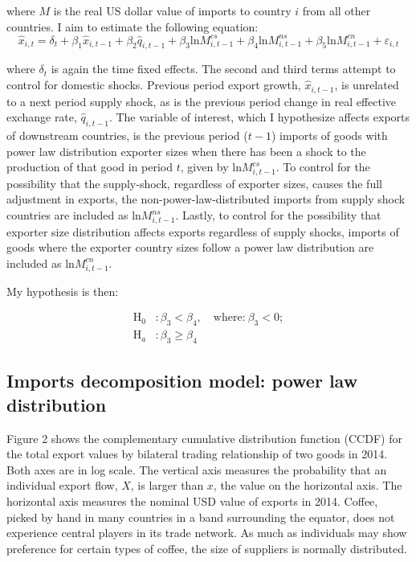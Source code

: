 \documentclass[10pt,letterpaper]{article}
\begin{document}
where $M$ is the real US dollar value of imports to country $i$ from all other countries. I aim to estimate the following equation:
$$ \hat{x}_{i,t} = \delta_{t} + \beta_1 \hat{x}_{i,t-1} + \beta_2 \hat{q}_{i,t-1} + \beta_3 \text{ln} M^{cs}_{i,t-1} + \beta_4 \text{ln} M^{ns}_{i,t-1} + \beta_5 \text{ln} M^{cn}_{i,t-1} + \varepsilon_{i,t} $$

where $\delta_t$ is again the time fixed effects. The second and third terms attempt to control for domestic shocks. Previous period export growth, $\hat{x}_{i,t-1}$,  is unrelated to a next period supply shock, as is the previous period change in real effective exchange rate, $\hat{q}_{i,t-1}$. The variable of interest, which I hypothesize affects exports of downstream countries, is the previous period ($t-1$) imports of goods with power law distribution exporter sizes when there has been a shock to the production of that good in period $t$, given by $\text{ln} M^{cs}_{i,t-1}$. To control for the possibility that the supply-shock, regardless of exporter sizes, causes the full adjustment in exports, the non-power-law-distributed imports from supply shock countries are included as $\text{ln} M^{ns}_{i,t-1}$. Lastly, to control for the possibility that exporter size distribution affects exports regardless of supply shocks, imports of goods where the exporter country sizes follow a power law distribution are included as $\text{ln} M^{cn}_{i,t-1}$.

My hypothesis is then:

\begin{align*}
\text{H}_0 &: \beta_3 < \beta_4, \quad \text{where:} \ \beta_3 < 0; \\
\text{H}_a &: \beta_3 \geq \beta_4 
\end{align*}

\subsection{Imports decomposition model: power law distribution}

Figure 2 shows the complementary cumulative distribution function (CCDF) for the total export values by bilateral trading relationship of two goods in 2014. Both axes are in log scale. The vertical axis measures the probability that an individual export flow, $X$, is larger than $x$, the value on the horizontal axis. The horizontal axis measures the nominal USD value of exports in 2014. Coffee, picked by hand in many countries in a band surrounding the equator, does not experience central players in its trade network. As much as individuals may show preference for certain types of coffee, the size of suppliers is normally distributed. 
\end{document}
